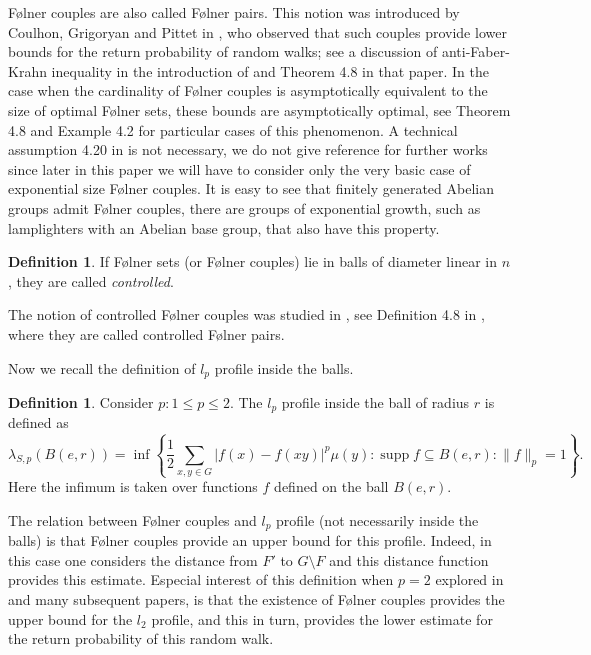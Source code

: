 \documentclass{amsart}
\numberwithin{figure}{section}
\theoremstyle{plain}
\theoremstyle{definition}
\newtheorem{definition}[thm]{Definition}
\begin{document}
F{\o}lner couples are also called F{\o}lner pairs.
This notion was introduced by Coulhon, Grigoryan and Pittet in \cite{coulhongrigoryanpittet}, who observed
that such couples provide lower bounds for the return probability of random walks; see a discussion of anti-Faber-Krahn
inequality in the introduction of \cite{coulhongrigoryanpittet} and Theorem 4.8 in that paper.
In the case when the cardinality of F{\o}lner couples
is asymptotically equivalent to the size of optimal F{\o}lner sets, these bounds are asymptotically optimal,
see Theorem 4.8 and Example 4.2 for particular cases of this phenomenon.
A technical assumption 4.20 in \cite{coulhongrigoryanpittet} is not necessary, we do not give reference for further works  since later in this paper  we will have to consider only the very basic case  of exponential size F{\o}lner couples.
It is easy to see that finitely generated Abelian groups admit F{\o}lner couples, there are groups of exponential growth, such as lamplighters with an Abelian base group, that also have this property.

\begin{definition}
If F{\o}lner sets (or F{\o}lner couples) lie in balls of diameter linear in $n$, they
are called {\it controlled}.
\end{definition}

The notion of controlled F{\o}lner couples
was studied in \cite{tesseracontrolled}, see Definition 4.8
in \cite{tesseracontrolled}, where they are called controlled F{\o}lner pairs.



Now we recall the definition of $l_p$ profile inside the balls.
\begin{definition} Consider $p: 1 \le p \le 2$.
The $l_p$ profile inside the ball of radius $r$ is defined as
\[
\lambda_{S,p}(B(e, r)) = \inf \left\{ \frac{1}{2} \sum_{x, y \in G} \left|f(x) - f(xy)\right|^p \mu(y) : \operatorname{supp} f \subseteq B(e, r) : \|f\|_p = 1 \right\}.
\]
Here the infimum is taken over functions $f$ defined on the ball $B(e, r)$.
\end{definition}


The relation between F{\o}lner couples and $l_p$ profile (not necessarily inside the balls)  is that F{\o}lner couples provide an upper  bound
for this profile.
Indeed, in this case one considers the distance from $F'$ to $G\setminus F$ and this distance function provides this estimate.
Especial interest of this definition when $p=2$
explored in \cite{coulhongrigoryanpittet} and many subsequent papers, is that the existence
of F{\o}lner couples provides the upper bound for the $l_2$ profile, and this in turn, provides the lower estimate for the return probability of this random walk.
\end{document}
